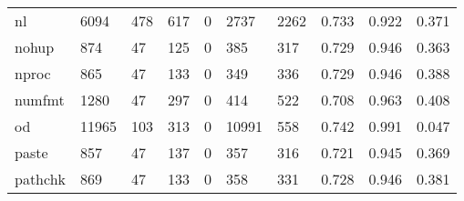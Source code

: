 \begin{longtable}{lp{2.0cm}p{2.0cm}p{2.0cm}p{2.0cm}p{2.0cm}p{2.0cm}p{2.0cm}p{2.0cm}p{2.0cm}}
nl        &                   6094 &                                478 &                               617 &                                0 &                              2737 &                            2262 &                                   0.733 &                                  0.922 &                                0.371 \\
nohup     &                    874 &                                 47 &                               125 &                                0 &                               385 &                             317 &                                   0.729 &                                  0.946 &                                0.363 \\
nproc     &                    865 &                                 47 &                               133 &                                0 &                               349 &                             336 &                                   0.729 &                                  0.946 &                                0.388 \\
numfmt    &                   1280 &                                 47 &                               297 &                                0 &                               414 &                             522 &                                   0.708 &                                  0.963 &                                0.408 \\
od        &                  11965 &                                103 &                               313 &                                0 &                             10991 &                             558 &                                   0.742 &                                  0.991 &                                0.047 \\
paste     &                    857 &                                 47 &                               137 &                                0 &                               357 &                             316 &                                   0.721 &                                  0.945 &                                0.369 \\
pathchk   &                    869 &                                 47 &                               133 &                                0 &                               358 &                             331 &                                   0.728 &                                  0.946 &                                0.381 \\

\end{longtable}
